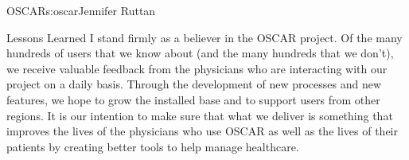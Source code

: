 \begin{aosachapter}{OSCAR}{s:oscar}{Jennifer Ruttan}
\begin{aosasect1}{Lessons Learned}
I stand firmly as a believer in the OSCAR project. Of the many
hundreds of users that we know about (and the many hundreds that we
don't), we receive valuable feedback from the physicians who are
interacting with our project on a daily basis. Through the development
of new processes and new features, we hope to grow the installed base
and to support users from other regions. It is our intention to make
sure that what we deliver is something that improves the lives of the
physicians who use OSCAR as well as the lives of their patients by
creating better tools to help manage healthcare.

\end{aosasect1}

\end{aosachapter}
